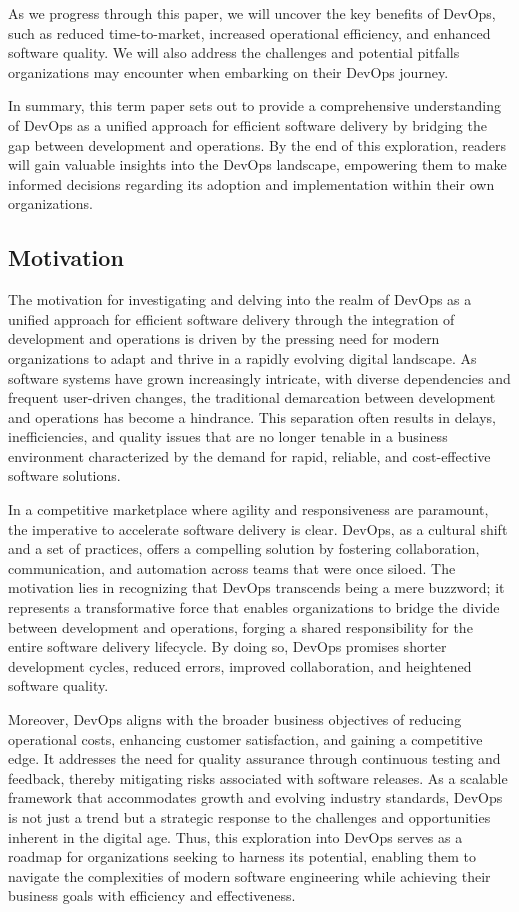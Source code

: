 \documentclass[12pt, letterpaper]{article}
\begin{document}
As we progress through this paper, we will uncover the key benefits of DevOps, such as reduced time-to-market, increased operational efficiency, and enhanced software quality. We will also address the challenges and potential pitfalls organizations may encounter when embarking on their DevOps journey\cite{Khan}.

In summary, this term paper sets out to provide a comprehensive understanding of DevOps as a unified approach for efficient software delivery by bridging the gap between development and operations. By the end of this exploration, readers will gain valuable insights into the DevOps landscape, empowering them to make informed decisions regarding its adoption and implementation within their own organizations\cite{elKhalyly}.

\subsection{Motivation}
The motivation for investigating and delving into the realm of DevOps as a unified approach for efficient software delivery through the integration of development and operations is driven by the pressing need for modern organizations to adapt and thrive in a rapidly evolving digital landscape. As software systems have grown increasingly intricate, with diverse dependencies and frequent user-driven changes, the traditional demarcation between development and operations has become a hindrance. This separation often results in delays, inefficiencies, and quality issues that are no longer tenable in a business environment characterized by the demand for rapid, reliable, and cost-effective software solutions\cite{Lwakatare}.

In a competitive marketplace where agility and responsiveness are paramount, the imperative to accelerate software delivery is clear. DevOps, as a cultural shift and a set of practices, offers a compelling solution by fostering collaboration, communication, and automation across teams that were once siloed\cite{Rafi}. The motivation lies in recognizing that DevOps transcends being a mere buzzword; it represents a transformative force that enables organizations to bridge the divide between development and operations, forging a shared responsibility for the entire software delivery lifecycle. By doing so, DevOps promises shorter development cycles, reduced errors, improved collaboration, and heightened software quality\cite{GUPTA201775}.

Moreover, DevOps aligns with the broader business objectives of reducing operational costs, enhancing customer satisfaction, and gaining a competitive edge. It addresses the need for quality assurance through continuous testing and feedback, thereby mitigating risks associated with software releases. As a scalable framework that accommodates growth and evolving industry standards, DevOps is not just a trend but a strategic response to the challenges and opportunities inherent in the digital age. Thus, this exploration into DevOps serves as a roadmap for organizations seeking to harness its potential, enabling them to navigate the complexities of modern software engineering while achieving their business goals with efficiency and effectiveness\cite{Diel}.
\end{document}
